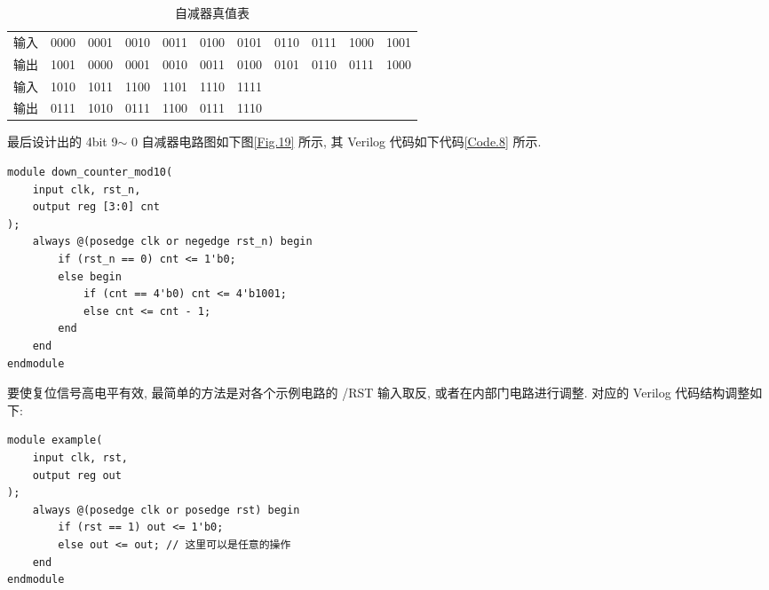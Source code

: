 \documentclass[UTF8,fontset=fandol]{ctexart}
\begin{document}
\begin{ExQuestions}
  \begin{table}[!ht]
    \centering
    \caption{自减器真值表}
    \label{Tab.3}
    \begin{tabular}{c|cccccccccc} 
    \hline
    输入                      & 0000                     & 0001                     & 0010                     & 0011                     & 0100                     & 0101                     & 0110                 & 0111                 & 1000                 & 1001                  \\
    输出                      & 1001                     & 0000                     & 0001                     & 0010                     & 0011                     & 0100                     & 0101                 & 0110                 & 0111                 & 1000                  \\ 
    \hline
    \multicolumn{1}{l|}{输入} & \multicolumn{1}{l}{1010} & \multicolumn{1}{l}{1011} & \multicolumn{1}{l}{1100} & \multicolumn{1}{l}{1101} & \multicolumn{1}{l}{1110} & \multicolumn{1}{l}{1111} & \multicolumn{1}{l}{} & \multicolumn{1}{l}{} & \multicolumn{1}{l}{} & \multicolumn{1}{l}{}  \\
    \multicolumn{1}{l|}{输出} & \multicolumn{1}{l}{0111} & \multicolumn{1}{l}{1010} & \multicolumn{1}{l}{0111} & \multicolumn{1}{l}{1100} & \multicolumn{1}{l}{0111} & \multicolumn{1}{l}{1110} & \multicolumn{1}{l}{} & \multicolumn{1}{l}{} & \multicolumn{1}{l}{} & \multicolumn{1}{l}{}  \\
    \hline
    \end{tabular}
  \end{table}

  最后设计出的 4bit 9$\sim$ 0 自减器电路图如下图\ref{Fig.19} 所示, 其 Verilog 代码如下代码\ref{Code.8} 所示.
  \begin{lstlisting}[style=verilogstyle, caption={4bit 9$\sim$ 0 自减器}, label={Code.8}]
module down_counter_mod10(
    input clk, rst_n,
    output reg [3:0] cnt
);
    always @(posedge clk or negedge rst_n) begin
        if (rst_n == 0) cnt <= 1'b0;
        else begin
            if (cnt == 4'b0) cnt <= 4'b1001;
            else cnt <= cnt - 1;
        end
    end
endmodule
  \end{lstlisting}

  \question 要使复位信号高电平有效, 最简单的方法是对各个示例电路的 /RST 输入取反, 或者在内部门电路进行调整.
  对应的 Verilog 代码结构调整如下:
  \begin{lstlisting}[style=verilogstyle, caption={对应的 Verilog 代码结构调整}, label={Code.9}]
module example(
    input clk, rst,
    output reg out
);
    always @(posedge clk or posedge rst) begin
        if (rst == 1) out <= 1'b0;
        else out <= out; // 这里可以是任意的操作
    end
endmodule
  \end{lstlisting}
\end{ExQuestions}
\end{document}
